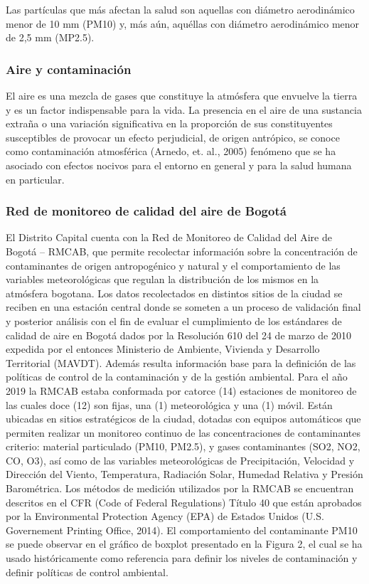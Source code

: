 Las partículas que más afectan la salud son aquellas con diámetro aerodinámico menor de 10 mm (PM10) y, más aún, aquéllas con diámetro aerodinámico menor de 2,5 mm (MP2.5).

\subsubsection{Aire y contaminación}

El aire es una mezcla de gases que constituye la atmósfera que envuelve la tierra y es un factor indispensable para la vida. 
La presencia en el aire de una sustancia extraña o una variación significativa en la proporción de sus constituyentes susceptibles de provocar un efecto perjudicial, de origen antrópico, se conoce como contaminación atmosférica (Arnedo, et. al., 2005) fenómeno que se ha asociado con efectos nocivos para el entorno en general y para la salud humana en particular.

\subsubsection{Red de monitoreo de calidad del aire de Bogotá}

El Distrito Capital cuenta con la Red de Monitoreo de Calidad del Aire de Bogotá – RMCAB, que permite recolectar información sobre la concentración de contaminantes de origen antropogénico y natural y el comportamiento de las variables meteorológicas que regulan la distribución de los mismos en la atmósfera bogotana.
Los datos recolectados en distintos sitios de la ciudad se reciben en una estación central donde se someten a un proceso de validación final y posterior análisis con el fin de evaluar el cumplimiento de los estándares de calidad de aire en Bogotá dados por la Resolución 610 del 24 de marzo de 2010 expedida por el entonces Ministerio de Ambiente, Vivienda y Desarrollo Territorial (MAVDT). Además resulta información base para la definición de las políticas de control de la contaminación y de la gestión ambiental.
Para el año 2019 la RMCAB estaba conformada por catorce (14) estaciones de monitoreo de las cuales doce (12) son fijas, una (1) meteorológica y una (1) móvil. Están ubicadas en sitios estratégicos de la ciudad, dotadas con equipos automáticos que permiten realizar un monitoreo continuo de las concentraciones de contaminantes criterio: material particulado (PM10, PM2.5), y gases contaminantes (SO2, NO2, CO, O3), así como de las variables meteorológicas de Precipitación, Velocidad y Dirección del Viento, Temperatura, Radiación Solar, Humedad Relativa y Presión Barométrica.
Los métodos de medición utilizados por la RMCAB se encuentran descritos en el CFR (Code of Federal Regulations) Título 40 que están aprobados por la Environmental Protection Agency (EPA) de Estados Unidos (U.S. Governement Printing Office, 2014).
El comportamiento del contaminante PM10 se puede observar en el gráfico de boxplot presentado en la Figura 2, el cual se ha usado históricamente como referencia para definir los niveles de contaminación y definir políticas de control ambiental.

